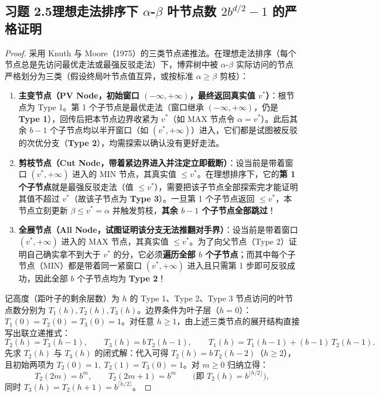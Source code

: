 \subsection*{习题 2.5\quad 理想走法排序下 $\alpha$-$\beta$ 叶节点数 $2 b^{d/2} - 1$ 的严格证明}
\begin{proof}
采用 Knuth 与 Moore（1975）的三类节点递推法。在理想走法排序（每个节点总是先访问最优走法或最强反驳走法）下，博弈树中被 $\alpha$-$\beta$ 实际访问的节点严格划分为三类（假设终局叶节点值互异，或按标准 $\alpha \ge \beta$ 剪枝）：
\begin{enumerate}[label=\textbf{Type \arabic*:}, leftmargin=4.2em]
  \item \textbf{主变节点（PV Node，初始窗口 $(-\infty, +\infty)$，最终返回真实值 $v^*$）}：根节点为 Type 1。第 1 个子节点是最优走法（窗口继承 $(-\infty, +\infty)$，仍是 \textbf{Type 1}），回传后把本节点边界收紧为 $v^*$（如 \textsf{MAX} 节点令 $\alpha=v^*$）。此后其余 $b-1$ 个子节点均以半开窗口（如 $(v^*, +\infty)$）进入，它们都是试图被反驳的次优分支（\textbf{Type 2}），均需探索以确认没有更好走法。
  \item \textbf{剪枝节点（Cut Node，带着紧边界进入并注定立即截断）}：设当前是带着窗口 $(v^*, +\infty)$ 进入的 \textsf{MIN} 节点，其真实值 $\le v^*$。在理想排序下，它的\textbf{第 1 个子节点}就是最强反驳走法（值 $\le v^*$），需要把该子节点全部探索完才能证明其值不超过 $v^*$（故该子节点为 \textbf{Type 3}）。一旦第 1 个子节点返回 $\le v^*$，本节点立刻更新 $\beta \le v^* = \alpha$ 并触发剪枝，\textbf{其余 $b-1$ 个子节点全部跳过}！
  \item \textbf{全展节点（All Node，试图证明该分支无法推翻对手界）}：设当前是带着窗口 $(v^*, +\infty)$ 进入的 \textsf{MAX} 节点，其真实值 $\le v^*$。为了向父节点（Type 2）证明自己确实拿不到大于 $v^*$ 的分，它必须\textbf{遍历全部 $b$ 个子节点}；而其中每个子节点（\textsf{MIN}）都是带着同一紧窗口 $(v^*, +\infty)$ 进入且只需第 1 步即可反驳成功，因此全部 $b$ 个子节点均为 \textbf{Type 2}！
\end{enumerate}

记高度（距叶子的剩余层数）为 $h$ 的 Type 1、Type 2、Type 3 节点访问的叶节点数分别为 $T_1(h), T_2(h), T_3(h)$。边界条件为叶子层（$h=0$）：$T_1(0) = T_2(0) = T_3(0) = 1$。对任意 $h \ge 1$，由上述三类节点的展开结构直接写出联立递推式：
\[
  T_2(h) = T_3(h - 1), \qquad
  T_3(h) = b\, T_2(h - 1), \qquad
  T_1(h) = T_1(h - 1) + (b - 1)\, T_2(h - 1).
\]
先求 $T_2(h)$ 与 $T_3(h)$ 的闭式解：代入可得 $T_2(h) = b\, T_2(h - 2)$（$h \ge 2$），且初始两项为 $T_2(0) = 1,\; T_2(1) = T_3(0) = 1$。对 $m \ge 0$ 归纳立得：
\[
  T_2(2m) = b^m, \qquad T_2(2m + 1) = b^m \qquad \big(\text{即 } T_2(h) = b^{\lfloor h/2 \rfloor}\big),
\]
同时 $T_3(h) = T_2(h+1) = b^{\lceil h/2 \rceil}$。


\end{proof}
